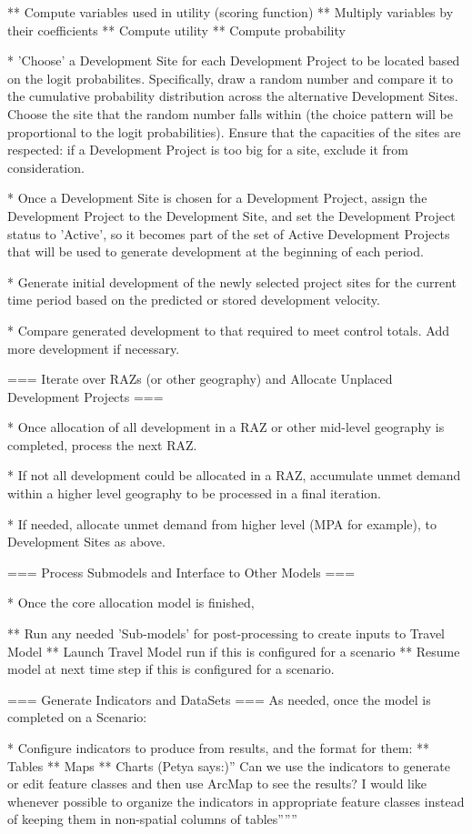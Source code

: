 ** Compute variables used in utility (scoring function)
** Multiply variables by their coefficients
** Compute utility
** Compute probability

* 'Choose' a Development Site for each Development Project to be located based on the logit probabilites.  Specifically, draw a random number and compare it to the cumulative probability distribution across the alternative Development Sites.  Choose the site that the random number falls within (the choice pattern will be proportional to the logit probabilities).  Ensure that the capacities of the sites are respected: if a Development Project is too big for a site, exclude it from consideration.

* Once a Development Site is chosen for a Development Project, assign the Development Project to the Development Site, and set the Development Project status to 'Active', so it becomes part of the set of Active Development Projects that will be used to generate development at the beginning of each period.

* Generate initial development of the newly selected project sites for the current time period based on the predicted or stored development velocity.

* Compare generated development to that required to meet control totals.  Add more development if necessary.

=== Iterate over RAZs (or other geography) and Allocate Unplaced Development Projects ===

* Once allocation of all development in a RAZ or other mid-level geography is completed, process the next RAZ.  

* If not all development could be allocated in a RAZ, accumulate unmet demand within a higher level geography to be processed in a final iteration.

* If needed, allocate unmet demand from higher level (MPA for example), to Development Sites as above.

=== Process Submodels and Interface to Other Models ===

* Once the core allocation model is finished,

** Run any needed 'Sub-models' for post-processing to create inputs to Travel Model
** Launch Travel Model run if this is configured for a scenario
** Resume model at next time step if this is configured for a scenario.

=== Generate Indicators and DataSets ===
As needed, once the model is completed on a Scenario:

* Configure indicators to produce from results, and the format for them:
** Tables
** Maps
** Charts
(Petya says:)'' Can we use the indicators to generate or edit feature classes and then use ArcMap to see the results? I would like whenever possible to organize the indicators in appropriate feature classes instead of keeping them in non-spatial columns of tables''''''

